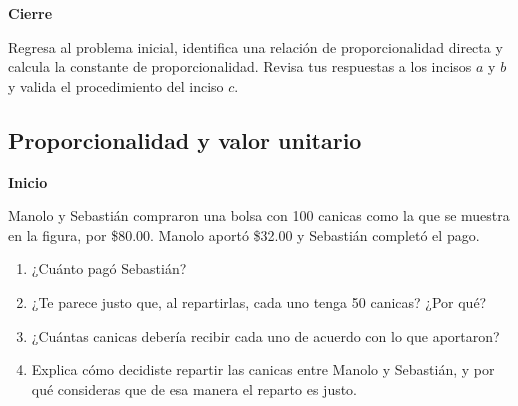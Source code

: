 \begin{boxK}
    \begin{center}\textbf{Cierre}\end{center}
    Regresa al problema inicial, identifica una relación de proporcionalidad directa y calcula
    la constante de proporcionalidad.
    Revisa tus respuestas a los incisos $a$ y $b$ y valida el procedimiento del inciso $c$.
\end{boxK}
\newpage
\subsection{Proporcionalidad y valor unitario}

\begin{boxK}
    \begin{center}\textbf{Inicio}\end{center}
    Manolo y Sebastián compraron una bolsa con 100 canicas como la que se muestra en la
    figura, por \$80.00. Manolo aportó \$32.00 y Sebastián completó el pago.
    \begin{enumerate}
        \item ¿Cuánto pagó Sebastián?
        \item ¿Te parece justo que, al repartirlas, cada uno tenga 50 canicas? ¿Por qué?
        \item ¿Cuántas canicas debería recibir cada uno de acuerdo con lo que aportaron?
        \item Explica cómo decidiste repartir las canicas entre Manolo y Sebastián, y por qué
              consideras que de esa manera el reparto es justo.
    \end{enumerate}
\end{boxK}

